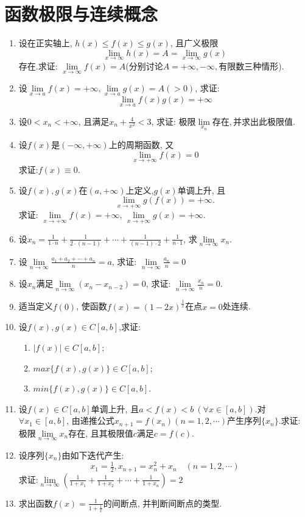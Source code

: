 \section{函数极限与连续概念}
\begin{enumerate}
	\item 设在正实轴上, $h(x)\le f(x)\le g(x)$, 且广义极限$$
	\lim\limits_{x\rightarrow \infty}h(x) = A = \lim\limits_{x\rightarrow \infty}g(x)$$存在.求证: $\lim\limits_{x\rightarrow \infty}f(x)=A$(分别讨论$A=+\infty,-\infty,有限数三种情形$).
	\item 设$\lim\limits_{x\rightarrow a}f(x)=+\infty,\lim\limits_{x\rightarrow a}g(x)=A(>0)$, 求证:$$
	\lim\limits_{x\rightarrow a}f(x)g(x) = +\infty$$
	\item 设$0<x_n<+\infty$, 且满足$x_n+\frac{4}{x^2}<3$, 求证: 极限$\lim\limits_{x_n}存在, 并求出此极限值$.
	\item 设$f(x)$是$(-\infty,+\infty)$上的周期函数, 又$$
	\lim\limits_{x\rightarrow +\infty}f(x)=0$$ 求证:$f(x)\equiv 0$.
	\item 设$f(x),g(x)$在$(a,+\infty)$上定义,$g(x)$单调上升, 且$$
	\lim\limits_{x\rightarrow +\infty}g(f(x))=+\infty.$$
	求证: $\lim\limits_{x\rightarrow +\infty}f(x)=+\infty$, $\lim\limits_{x\rightarrow +\infty}g(x)=+\infty$.
	\item 设$x_n=\tfrac{1}{1 \cdot n}+\tfrac{1}{2 \cdot (n-1)}+\cdots+\tfrac{1}{(n-1) \cdot 2}+\tfrac{1}{n \cdot 1}$, 求$\lim\limits_{n\rightarrow \infty}x_n$.
	\item 设$\lim\limits_{n\rightarrow \infty}\tfrac{a_1+a_2+\cdots+a_n}{n}=a$, 求证: $\lim\limits_{n\rightarrow \infty}\tfrac{a_n}{n}=0$
	\item 设${x_n}$满足$\lim\limits_{n\rightarrow \infty}(x_n-x_{n-2})=0$, 求证: $\lim\limits_{n\rightarrow \infty}\tfrac{x_n}{n}=0$.
	\item 适当定义$f(0)$, 使函数$f(x)=(1-2x)^\frac{1}{x}$在点$x=0$处连续.
	\item 设$ f(x),g(x)\in C[a,b]$,求证:
	\begin{enumerate}
		\item $|f(x)|\in C[a,b];$\
		\item $max\{f(x),g(x)\}\in C[a,b]$;
		\item $min\{f(x),g(x)\}\in C[a,b]$.
	\end{enumerate}
	\item 设$f(x)\in C[a,b]$单调上升, 且$a<f(x)<b\ (\forall x\in [a,b])$.对$\forall x_1 \in [a,b]$, 由递推公式$x_{n+1}=f(x_n)(n=1,2,\cdots)$产生序列$\{x_n\}$.求证: 极限$\lim\limits_{n\rightarrow \infty}x_n$存在, 且其极限值$c$满足$c=f(c)$.
	\item 设序列$\{x_n\}$由如下迭代产生:
	$$
	x_1 = \tfrac{1}{2}, x_{n+1} = x_{n}^2 + x_n \quad (n = 1,2,\cdots)
	$$求证:$\lim\limits_{n\rightarrow \infty}(\frac{1}{1+x_1}+\frac{1}{1+x_2}+\cdots+\frac{1}{1+x_n})=2$
	\item 求出函数$f(x)=\frac{1}{1+\frac{1}{x}}$的间断点, 并判断间断点的类型.
\end{enumerate}
